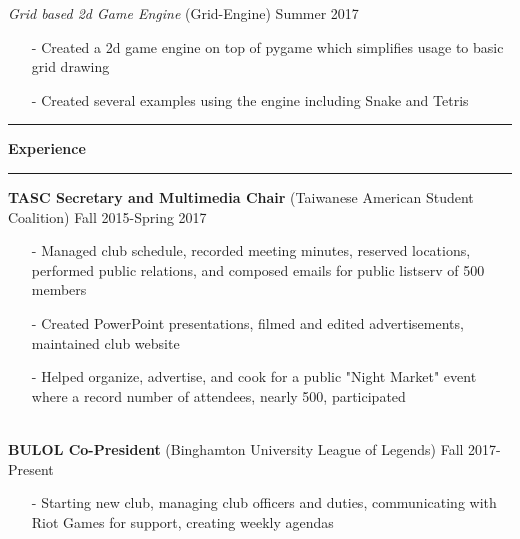 \documentclass[10pt]{article}
\newcommand{\Hrule}{\vspace{0.7mm}\hrule\vspace{0.7mm}}
\newcommand{\Indent}{\indent\indent}
\begin{document}
            \Indent \small\textit{Grid based 2d Game Engine}\small{ (Grid-Engine)} \hfill \small{Summer 2017}\indent\vspace{0.5mm}\\
                \Indent\begin{minipage}{\dimexpr\textwidth-6cm}
                    \begin{itemize}[noitemsep, topsep=0pt]
                        \item[-] Created a 2d game engine on top of pygame which simplifies usage to basic grid drawing
                        \item[-] Created several examples using the engine including Snake and Tetris
                    \end{itemize}\vspace{0mm}
                \end{minipage}
\Hrule\noindent\textbf{\normalsize Experience}\Hrule
    \indent\small{\textbf{TASC Secretary and Multimedia Chair} (Taiwanese American Student Coalition)} \hfill \small{Fall 2015-Spring 2017}\indent\vspace{0.5mm}
        \indent\begin{minipage}{\dimexpr\textwidth-6cm}
            \begin{itemize}[noitemsep, topsep=0pt]
                \item[-] Managed club schedule, recorded meeting minutes, reserved locations, performed public relations, and composed emails for public listserv of 500 members
                \item[-] Created PowerPoint presentations, filmed and edited advertisements, maintained club website
                \item[-] Helped organize, advertise, and cook for a public "Night Market" event where a record number of attendees, nearly 500, participated
            \end{itemize}\vspace{0mm}
        \end{minipage}\\
    \indent\small{\textbf{BULOL Co-President} (Binghamton University League of Legends)} \hfill \small{Fall 2017-Present}\indent\vspace{0.5mm}\\
        \indent\begin{minipage}{\dimexpr\textwidth-6cm}
            \begin{itemize}[noitemsep, topsep=0pt]
                \item[-] Starting new club, managing club officers and duties, communicating with Riot Games for support, creating weekly agendas
            \end{itemize}\vspace{0mm}
        \end{minipage}\\
\end{document}
